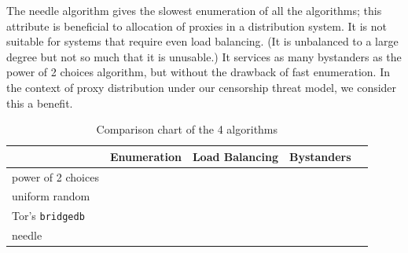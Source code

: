The needle algorithm gives the slowest enumeration of all the algorithms; this attribute is beneficial to allocation of proxies in a distribution system. It is not suitable for systems that require even load balancing. (It is unbalanced to a large degree but not so much that it is unusable.) It services as many bystanders as the power of 2 choices algorithm, but without the drawback of fast enumeration. In the context of proxy distribution under our censorship threat model, we consider this a benefit.

\begin{table}[t]
\begin{tabular}{l*{3}{|c}r}
             & Enumeration & Load Balancing & Bystanders \\
\hline
\hline
power of 2 choices &   &  &  \\
uniform random            &   &  &   \\
Tor's \texttt{bridgedb} &   &  &   \\
needle           &   &   &   \\
\end{tabular}
\caption{Comparison chart of the 4 algorithms\label{tab:tradeoff} }
\end{table}